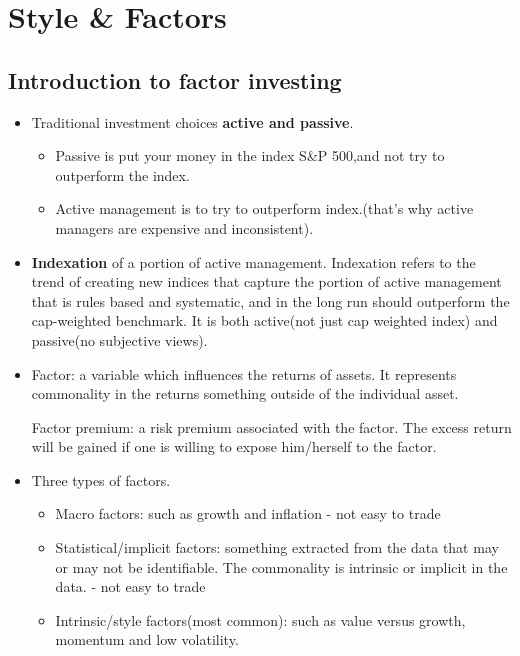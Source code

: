 \documentclass{maths}
\begin{document}
\section{Style \& Factors}
\subsection{Introduction to factor investing}
\begin{itemize}

\item Traditional investment choices \textbf{active and passive}. 
\begin{itemize}
\item Passive is put your money in the index S\&P 500,and not try to outperform the index. 
\item Active management is to try to outperform index.(that's why active managers are expensive and inconsistent). 
\end{itemize}
\item \textbf{Indexation} of a portion of active management. Indexation refers to the trend of creating new indices that capture the portion of active management that is rules based and systematic, and in the long run should outperform the cap-weighted benchmark. It is both active(not just cap weighted index) and passive(no subjective views).

\item Factor: a variable which influences the returns of assets. It represents commonality in the returns something outside of the individual asset. 

Factor premium: a risk premium associated with the factor. The excess return will be gained if one is willing to expose him/herself to the factor.

\item Three types of factors.
\begin{itemize}
\item Macro factors: such as growth and inflation - not easy to trade
\item Statistical/implicit factors: something extracted from the data that may or may not be identifiable. The commonality is intrinsic or implicit in the data. - not easy to trade
\item Intrinsic/style factors(most common): such as value versus growth, momentum and low volatility.
\end{itemize}

\end{itemize}
\end{document}
